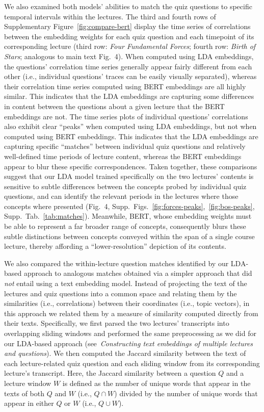 \documentclass[10pt]{article}
\newcommand{\questionCorrs}{4}
\newcommand{\topicModelMethods}{\textit{Constructing text embeddings of multiple lectures and questions}}
\begin{document}
We also examined both models' abilities to match the quiz questions to specific 
temporal intervals within the lectures. The third and fourth rows of 
Supplementary Figure~\ref{fig:compare-bert} display the time series of 
correlations between the embedding weights for each quiz question and each 
timepoint of its corresponding lecture (third row: \textit{Four Fundamental 
Forces}; fourth row: \textit{Birth of Stars}; analogous to main text 
Fig.~\questionCorrs). When computed using LDA embeddings, the questions' 
correlation time series generally appear fairly different from each other (i.e., 
individual questions' traces can be easily visually separated), whereas their 
correlation time series computed using BERT embeddings are all highly similar. 
This indicates that the LDA embeddings are capturing some differences in content 
between the questions about a given lecture that the BERT embeddings are not. 
The time series plots of individual questions' correlations also exhibit clear 
``peaks'' when computed using LDA embeddings, but not when computed using BERT 
embeddings. This indicates that the LDA embeddings are capturing specific 
``matches'' between individual quiz questions and relatively well-defined time 
periods of lecture content, whereas the BERT embeddings appear to blur these 
specific correspondences. Taken together, these comparisons suggest that our LDA 
model trained specifically on the two lectures' contents is sensitive to subtle 
differences between the concepts probed by individual quiz questions, and can 
identify the relevant periods in the lectures where those concepts where 
presented (Fig.~\questionCorrs, 
Supp.~Figs.~\ref{fig:forces-peaks},~\ref{fig:bos-peaks}, 
Supp.~Tab.~\ref{tab:matches}). Meanwhile, BERT, whose embedding weights must be 
able to represent a far broader range of concepts, consequently blurs these 
subtle distinctions between concepts conveyed within the span of a single course 
lecture, thereby affording a ``lower-resolution'' depiction of its contents. 

We also compared the within-lecture question matches identified by our LDA-based 
approach to analogous matches obtained via a simpler approach that did 
\textit{not} entail using a text embedding model. Instead of projecting the text 
of the lectures and quiz questions into a common space and relating them by the 
similarities (i.e., correlations) between their coordinates (i.e., topic 
vectors), in this approach we related them by a measure of similarity computed 
directly from their texts. Specifically, we first parsed the two lectures' 
transcripts into overlapping sliding windows and performed the same 
preprocessing as we did for our LDA-based approach (see~\topicModelMethods). We 
then computed the Jaccard similarity between the text of each lecture-related 
quiz question and each sliding window from its corresponding lecture's 
transcript. Here, the Jaccard similarity between a question $Q$ and a lecture 
window $W$ is defined as the number of unique words that appear in the texts of 
both $Q$ and $W$ (i.e., $Q \cap W$) divided by the number of unique words that 
appear in either $Q$ or $W$ (i.e., $Q \cup W$). 
\end{document}
